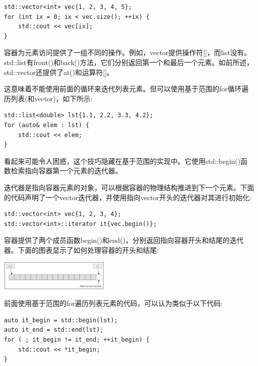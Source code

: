 \begin{lstlisting}[caption={}]
std::vector<int> vec{1, 2, 3, 4, 5};
for (int ix = 0; ix < vec.size(); ++ix) {
	std::cout << vec[ix];
}
\end{lstlisting}

容器为元素访问提供了一组不同的操作。例如，vector提供操作符[]，而list没有。std::list有front()和back()方法，它们分别返回第一个和最后一个元素。如前所述，std::vector还提供了at()和运算符[]。 \par
这意味着不能使用前面的循环来迭代列表元素。但可以使用基于范围的for循环遍历列表(和vector)，如下所示: \par

\begin{lstlisting}[caption={}]
std::list<double> lst{1.1, 2.2, 3.3, 4.2};
for (auto& elem : lst) {
	std::cout << elem;
}
\end{lstlisting}

看起来可能令人困惑，这个技巧隐藏在基于范围的实现中。它使用std::begin()函数检索指向容器第一个元素的迭代器。 \par 
迭代器是指向容器元素的对象，可以根据容器的物理结构推进到下一个元素。下面的代码声明了一个vector迭代器，并使用指向vector开头的迭代器对其进行初始化: \par

\begin{lstlisting}[caption={}]
std::vector<int> vec{1, 2, 3, 4};
std::vector<int>::iterator it{vec.begin()};
\end{lstlisting}

容器提供了两个成员函数begin()和end()，分别返回指向容器开头和结尾的迭代器。下面的图表显示了如何处理容器的开头和结尾: \par

\begin{center}
	\includegraphics[width=0.4\textwidth]{content/Section-2/Chapter-6/18}
\end{center}

前面使用基于范围的for遍历列表元素的代码，可以认为类似于以下代码: \par

\begin{lstlisting}[caption={}]
auto it_begin = std::begin(lst);
auto it_end = std::end(lst);
for ( ; it_begin != it_end; ++it_begin) {
	std::cout << *it_begin;
}
\end{lstlisting}

